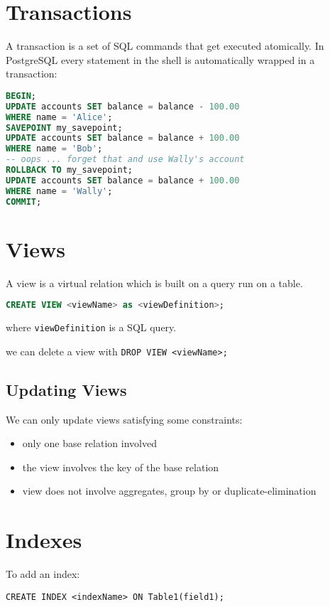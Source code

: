 \documentclass{sciposter}
\renewcommand{\t}[1]{\texttt{#1}}
\begin{document}
\begin{multicols}{3}
\section*{Transactions}


A transaction is a set of SQL commands that get executed atomically. In PostgreSQL every statement in the shell is automatically wrapped in a transaction:

\begin{lstlisting}[language=SQL]
BEGIN;
UPDATE accounts SET balance = balance - 100.00
WHERE name = 'Alice';
SAVEPOINT my_savepoint;
UPDATE accounts SET balance = balance + 100.00
WHERE name = 'Bob';
-- oops ... forget that and use Wally's account
ROLLBACK TO my_savepoint;
UPDATE accounts SET balance = balance + 100.00
WHERE name = 'Wally';
COMMIT;

\end{lstlisting}


\section*{Views}

A view is a virtual relation which is built on a query run on a table. 
\begin{lstlisting}[language=SQL]
CREATE VIEW <viewName> as <viewDefinition>;
\end{lstlisting}
where \t{viewDefinition} is a SQL query.

we can delete a view with \t{DROP VIEW <viewName>;}

\subsection*{Updating Views}

We can only update views satisfying some constraints:
\begin{itemize}
	\item only one base relation involved
	\item the view involves the key of the base relation
	\item view does not involve aggregates, group by or duplicate-elimination
\end{itemize}


\section*{Indexes}

To add an index:

\t{CREATE INDEX <indexName> ON Table1(field1);}


\end{multicols}
\end{document}
